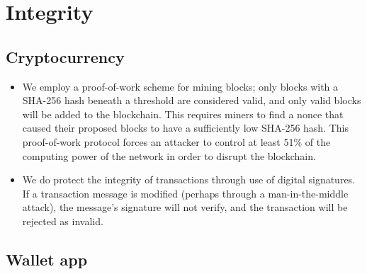 \documentclass[a4paper,12pt]{article}
\begin{document}
\section{Integrity}

\subsection{Cryptocurrency}

\begin{itemize}
\item We employ a proof-of-work scheme for mining blocks; only blocks with a SHA-256 hash beneath a threshold are considered valid, and only valid blocks will be added to the blockchain.
This requires miners to find a nonce that caused their proposed blocks to have a sufficiently low SHA-256 hash.
This proof-of-work protocol forces an attacker to control at least 51\% of the computing power of the network in order to disrupt the blockchain\cite{bitcoin}.
\item We do protect the integrity of transactions through use of digital signatures. If a transaction message is modified (perhaps through a man-in-the-middle attack), the message's signature will not verify, and the transaction will be rejected as invalid.
\end{itemize}

\subsection{Wallet app}
\end{document}
